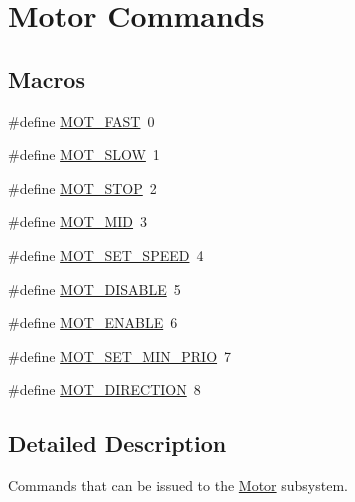 \hypertarget{group__motor__commands}{\section{Motor Commands}
\label{group__motor__commands}
}
\subsection*{Macros}
\begin{DoxyCompactItemize}
\item 
\#define \hyperlink{group__motor__commands_gae64835867a818685e7e9172a8cb21b9e}{M\-O\-T\-\_\-\-F\-A\-S\-T}~0
\item 
\#define \hyperlink{group__motor__commands_gab1d9e4b8515c9040e93ba9edcdb843a3}{M\-O\-T\-\_\-\-S\-L\-O\-W}~1
\item 
\#define \hyperlink{group__motor__commands_gaf57de7232e513663b5793fce23b2795a}{M\-O\-T\-\_\-\-S\-T\-O\-P}~2
\item 
\#define \hyperlink{group__motor__commands_ga90a66dc37a63d7ff939b606b1d5ba87c}{M\-O\-T\-\_\-\-M\-I\-D}~3
\item 
\#define \hyperlink{group__motor__commands_ga318320d9d310be3e25a20f55ccbda7a6}{M\-O\-T\-\_\-\-S\-E\-T\-\_\-\-S\-P\-E\-E\-D}~4
\item 
\#define \hyperlink{group__motor__commands_gae90f36d9158b625125ec5b6b6b12342d}{M\-O\-T\-\_\-\-D\-I\-S\-A\-B\-L\-E}~5
\item 
\#define \hyperlink{group__motor__commands_ga538be16bfce1294561c04bbfca368475}{M\-O\-T\-\_\-\-E\-N\-A\-B\-L\-E}~6
\item 
\#define \hyperlink{group__motor__commands_ga0c48e1fea8fe34438ee9e9b2e101d1de}{M\-O\-T\-\_\-\-S\-E\-T\-\_\-\-M\-I\-N\-\_\-\-P\-R\-I\-O}~7
\item 
\#define \hyperlink{group__motor__commands_gae0799d3b48368ff66fd88b500aab5d50}{M\-O\-T\-\_\-\-D\-I\-R\-E\-C\-T\-I\-O\-N}~8
\end{DoxyCompactItemize}


\subsection{Detailed Description}
Commands that can be issued to the \hyperlink{classMotor}{Motor} subsystem. 

